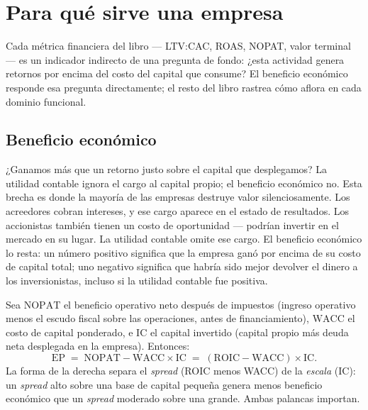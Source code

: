 \chapter{Para qué sirve una empresa}\label{ch:value-creation}


Cada métrica financiera del libro --- LTV:CAC, ROAS, NOPAT, valor terminal --- es un indicador
indirecto de una pregunta de fondo: ¿esta actividad genera retornos por encima del costo del
capital que consume? El beneficio económico responde esa pregunta directamente; el resto del libro
rastrea cómo aflora en cada dominio funcional.

\section{Beneficio económico}\label{sec:economic-profit}

¿Ganamos más que un retorno justo sobre el capital que desplegamos? La utilidad contable ignora
el cargo al capital propio; el beneficio económico no. Esta brecha es donde la mayoría de las
empresas destruye valor silenciosamente. Los acreedores cobran intereses, y ese cargo aparece en
el estado de resultados. Los accionistas también tienen un costo de oportunidad --- podrían
invertir en el mercado en su lugar. La utilidad contable omite ese cargo. El beneficio económico
lo resta: un número positivo significa que la empresa ganó por encima de su costo de capital
total; uno negativo significa que habría sido mejor devolver el dinero a los inversionistas,
incluso si la utilidad contable fue positiva.

Sea \(\mathrm{NOPAT}\) el beneficio operativo neto después de impuestos (ingreso operativo menos
el escudo fiscal sobre las operaciones, antes de financiamiento), \(\mathrm{WACC}\) el costo de
capital ponderado, e \(\mathrm{IC}\) el capital invertido (capital propio más deuda neta desplegada
en la empresa). Entonces:
\begin{equation}\label{eq:economic-profit}
  \mathrm{EP}
    \;=\; \mathrm{NOPAT} - \mathrm{WACC}\times\mathrm{IC}
    \;=\; (\mathrm{ROIC}-\mathrm{WACC})\times\mathrm{IC}.
\end{equation}
La forma de la derecha separa el \emph{spread} (ROIC menos WACC) de la \emph{escala} (IC): un
\emph{spread} alto sobre una base de capital pequeña genera menos beneficio económico que un
\emph{spread} moderado sobre una grande. Ambas palancas importan.

